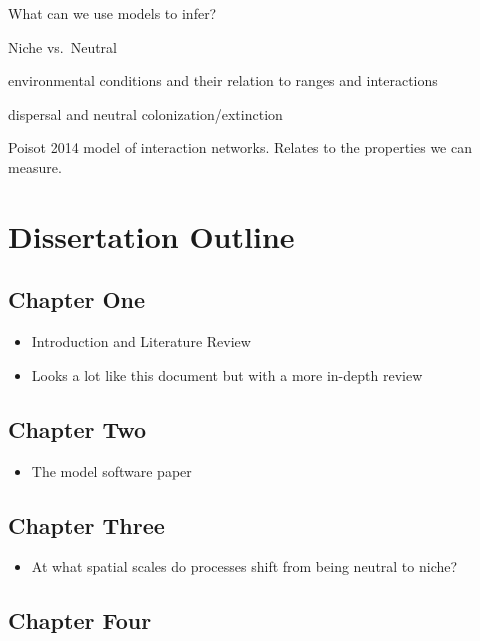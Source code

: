 What can we use models to infer?

Niche vs.~Neutral

environmental conditions and their relation to ranges and interactions

dispersal and neutral colonization/extinction

Poisot 2014 model of interaction networks. Relates to the properties we
can measure.

\hypertarget{dissertation-outline}{%
\section{Dissertation Outline}\label{dissertation-outline}}

\hypertarget{chapter-one}{%
\subsection{Chapter One}\label{chapter-one}}

\begin{itemize}
\item
  Introduction and Literature Review
\item
  Looks a lot like this document but with a more in-depth review
\end{itemize}

\hypertarget{chapter-two}{%
\subsection{Chapter Two}\label{chapter-two}}

\begin{itemize}
\tightlist
\item
  The model software paper
\end{itemize}

\hypertarget{chapter-three}{%
\subsection{Chapter Three}\label{chapter-three}}

\begin{itemize}
\tightlist
\item
  At what spatial scales do processes shift from being neutral to niche?
\end{itemize}

\hypertarget{chapter-four}{%
\subsection{Chapter Four}\label{chapter-four}}

